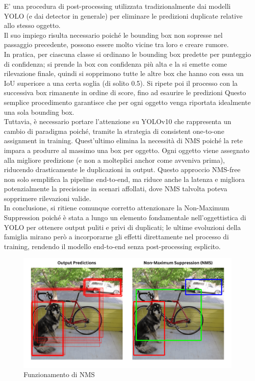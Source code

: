 \documentclass[12pt]{article}
\begin{document}
E' una procedura di post-processing utilizzata tradizionalmente dai modelli YOLO (e dai detector in generale) per eliminare le predizioni duplicate relative allo stesso oggetto. \\
Il suo impiego risulta necessario poiché le bounding box non sopresse nel passaggio precedente, possono essere molto vicine tra loro e creare rumore.  \\
In pratica, per ciascuna classe si ordinano le bounding box predette per punteggio di confidenza; si prende la box con confidenza più alta e la si emette come rilevazione finale, quindi si sopprimono tutte le altre box che hanno con essa un IoU superiore a una certa soglia (di solito 0.5). Si ripete poi il processo con la successiva box rimanente in ordine di score, fino ad esaurire le predizioni
Questo semplice procedimento garantisce che per ogni oggetto venga riportata idealmente una sola bounding box. \\
Tuttavia, è necessario portare l'attenzione su  YOLOv10 che rappresenta un cambio di paradigma poiché, tramite la strategia di consistent one-to-one assignment in training. Quest'ultimo elimina la necessità di NMS poiché la rete impara a produrre al massimo una box per oggetto. Ogni oggetto viene assegnato alla migliore predizione (e non a molteplici anchor come avveniva prima), riducendo drasticamente le duplicazioni in output. Questo approccio NMS-free non solo semplifica la pipeline end-to-end, ma riduce anche la latenza e migliora potenzialmente la precisione in scenari affollati, dove NMS talvolta poteva sopprimere rilevazioni valide. \\
In conclusione, si ritiene comunque corretto attenzionare la Non-Maximum Suppression poiché è stata a lungo un elemento fondamentale nell’oggettistica di YOLO per ottenere output puliti e privi di duplicati; le ultime evoluzioni della famiglia mirano però a incorporarne gli effetti direttamente nel processo di training, rendendo il modello end-to-end senza post-processing esplicito.

\begin{figure}[H]
    \centering
    \includegraphics[width=1.0\textwidth]{./img/nms-img.png}
    \caption{Funzionamento di NMS}
    \label{fig:nms-example}
\end{figure}
\end{document}
